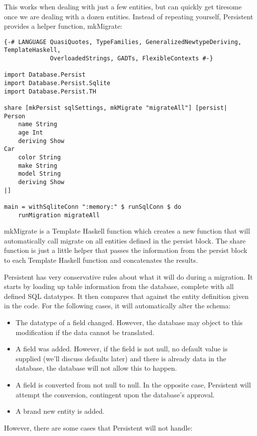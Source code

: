 This works when dealing with just a few entities, but can quickly get tiresome once we are dealing with a dozen entities. Instead of repeating yourself, Persistent provides a helper function, mkMigrate:

\begin{lstlisting}
{-# LANGUAGE QuasiQuotes, TypeFamilies, GeneralizedNewtypeDeriving, TemplateHaskell,
             OverloadedStrings, GADTs, FlexibleContexts #-}

import Database.Persist
import Database.Persist.Sqlite
import Database.Persist.TH

share [mkPersist sqlSettings, mkMigrate "migrateAll"] [persist|
Person
    name String
    age Int
    deriving Show
Car
    color String
    make String
    model String
    deriving Show
|]

main = withSqliteConn ":memory:" $ runSqlConn $ do
    runMigration migrateAll
\end{lstlisting}

mkMigrate is a Template Haskell function which creates a new function that will automatically call migrate on all entities defined in the persist block. The share function is just a little helper that passes the information from the persist block to each Template Haskell function and concatenates the results.

Persistent has very conservative rules about what it will do during a migration. It starts by loading up table information from the database, complete with all defined SQL datatypes. It then compares that against the entity definition given in the code. For the following cases, it will automatically alter the schema:

\begin{itemize}
	\item The datatype of a field changed. However, the database may object to this modification if the data cannot be translated.
	\item A field was added. However, if the field is not null, no default value is supplied (we'll discuss defaults later) and there is already data in the database, the database will not allow this to happen.
	\item A field is converted from not null to null. In the opposite case, Persistent will attempt the conversion, contingent upon the database's approval.
	\item A brand new entity is added.
\end{itemize}

However, there are some cases that Persistent will not handle:

